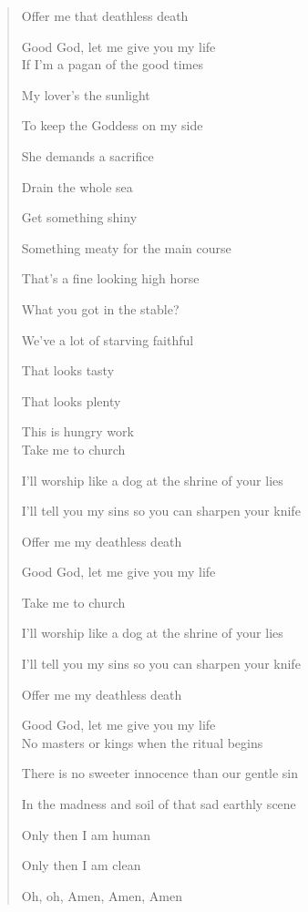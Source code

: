 \documentclass{book}
\numberwithin{equation}{section}
\begin{document}
\begin{quotation}
    Offer me that deathless death
    
    Good God, let me give you my life
    \\
    
    If I'm a pagan of the good times
    
    My lover's the sunlight
    
    To keep the Goddess on my side
    
    She demands a sacrifice
    
    Drain the whole sea
    
    Get something shiny
    
    Something meaty for the main course
    
    That's a fine looking high horse
    
    What you got in the stable?
    
    We've a lot of starving faithful
    
    That looks tasty
    
    That looks plenty
    
    This is hungry work
    \\
    
    Take me to church
    
    I'll worship like a dog at the shrine of your lies
    
    I'll tell you my sins so you can sharpen your knife
    
    Offer me my deathless death
    
    Good God, let me give you my life
    
    Take me to church
    
    I'll worship like a dog at the shrine of your lies
    
    I'll tell you my sins so you can sharpen your knife
    
    Offer me my deathless death
    
    Good God, let me give you my life
    \\
    
    No masters or kings when the ritual begins
    
    There is no sweeter innocence than our gentle sin
    
    In the madness and soil of that sad earthly scene
    
    Only then I am human
    
    Only then I am clean
    
    Oh, oh, Amen, Amen, Amen
    \\
    

\end{quotation}
\end{document}

